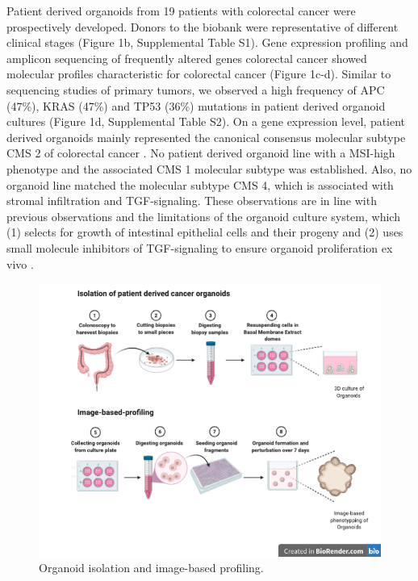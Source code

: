 \begin{flushleft}
Patient derived organoids from 19 patients with colorectal cancer were prospectively developed. Donors to the biobank were representative of different clinical stages (Figure 1b, Supplemental Table S1). Gene expression profiling and amplicon sequencing of frequently altered genes colorectal cancer showed molecular profiles characteristic for colorectal cancer (Figure 1c-d). Similar to sequencing studies of primary tumors, we observed a high frequency of APC (47\%), KRAS (47\%) and TP53 (36\%) mutations in patient derived organoid cultures \cite{Muzny2012-hr} (Figure 1d, Supplemental Table S2). On a gene expression level, patient derived organoids mainly represented the canonical consensus molecular subtype CMS 2 of colorectal cancer \cite{Guinney2015-ex}. No patient derived organoid line with a MSI-high phenotype and the associated CMS 1 molecular subtype was established. Also, no organoid line matched the molecular subtype CMS 4, which is associated with stromal infiltration and TGF\beta-signaling. These observations are in line with previous observations \cite{Van_De_Wetering2015-ko, Schutte2017-fl} and the limitations of the organoid culture system, which (1) selects for growth of intestinal epithelial cells and their progeny and (2) uses small molecule inhibitors of TGF\beta-signaling to ensure organoid proliferation ex vivo \cite{Sato2011-lh}.

\begin{figure}[h]
\centering
\includegraphics[scale=.35]{figures/organoid_establishment.png}
\caption{Organoid isolation and image-based profiling.}
\label{colon_cancer_progression}
\end{figure}

\end{flushleft}
